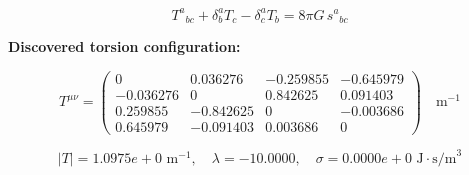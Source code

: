 
\begin{equation}
  T^a{}_{bc} + \delta^a_b T_c - \delta^a_c T_b = 8\pi G \, s^a{}_{bc}
\end{equation}

\textbf{Discovered torsion configuration:}

\begin{equation}
  T^{\mu\nu} = \begin{pmatrix}
    0 & 0.036276 & -0.259855 & -0.645979 \\
    -0.036276 & 0 & 0.842625 & 0.091403 \\
    0.259855 & -0.842625 & 0 & -0.003686 \\
    0.645979 & -0.091403 & 0.003686 & 0
  \end{pmatrix} \quad \text{m}^{-1}
\end{equation}

\begin{equation}
  |T| = 1.0975e+0 \text{ m}^{-1}, \quad
  \lambda = -10.0000, \quad
  \sigma = 0.0000e+0 \text{ J}\cdot\text{s/m}^3
\end{equation}